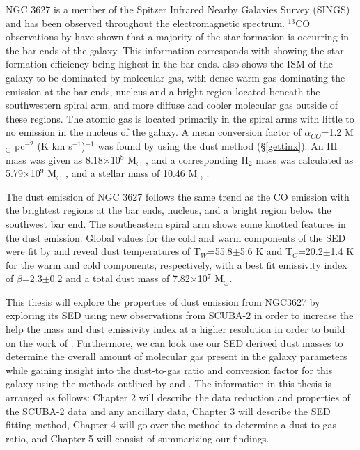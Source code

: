 NGC 3627 is a member of the Spitzer Infrared Nearby Galaxies Survey (SINGS) \citep{kennicutt2003} and has been observed throughout the electromagnetic spectrum.  $^{13}$CO observations by \cite{watanabe2011} have shown that a majority of the star formation is occurring in the bar ends of the galaxy.  This information corresponds with \cite{warren2010} showing the star formation efficiency being highest in the bar ends.  \cite{warren2010} also shows the ISM of the galaxy to be dominated by molecular gas, with dense warm gas dominating the emission at the bar ends, nucleus and a bright region located beneath the southwestern spiral arm, and more diffuse and cooler molecular gas outside of these regions.  The atomic gas is located primarily in the spiral arms with little to no emission in the nucleus of the galaxy.  A mean conversion factor of $\alpha_{CO}$=1.2 M$_\odot$ pc$^{-2}$ (K km s$^{-1}$)$^{-1}$ was found by \cite{sandstrom2013} using the dust method (\S\ref{gettinx}).  An HI mass was given as 8.18$\times$10$^8$ M$_\odot$ \citep{walter2008}, and a corresponding H$_2$ mass was calculated as 5.79$\times$10$^9$ M$_\odot$ \citep{kennicutt2003}, and a stellar mass of 10.46 M$_\odot$ \citep{skibba2011}.

The dust emission of NGC 3627 follows the same trend as the CO emission with the brightest regions at the bar ends, nucleus, and a bright region below the southwest bar end.  The southeastern spiral arm shows some knotted features in the dust emission.  Global values for the cold and warm components of the SED were fit by \cite{galametz2012} and reveal dust temperatures of T$_W$=55.8$\pm$5.6 K and T$_C$=20.2$\pm$1.4 K for the warm and cold components, respectively, with a best fit emissivity index of $\beta$=2.3$\pm$0.2 and a total dust mass of 7.82$\times$10$^7$ M$_\odot$.

This thesis will explore the properties of dust emission from NGC3627 by exploring its SED using new observations from SCUBA-2 in order to increase the help the mass and dust emissivity index at a higher resolution in order to build on the work of \cite{galametz2012}.  Furthermore, we can look use our SED derived dust masses to determine the overall amount of molecular gas present in the galaxy parameters while gaining insight into the dust-to-gas ratio and conversion factor for this galaxy using the methods outlined by \cite{leroy2009} and \cite{sandstrom2013}.  The information in this thesis is arranged as follows: Chapter 2 will describe the data reduction and properties of the SCUBA-2 data and any ancillary data, Chapter 3 will describe the SED fitting method, Chapter 4 will go over the method to determine a dust-to-gas ratio, and Chapter 5 will consist of summarizing our findings.